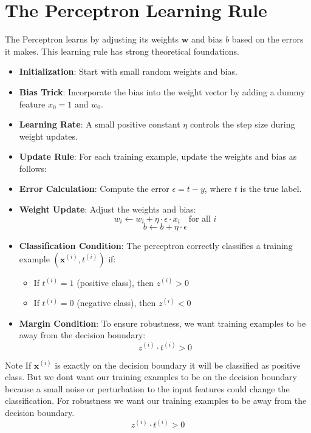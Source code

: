 \section{The Perceptron Learning Rule}
The Perceptron learns by adjusting its weights \(\mathbf{w}\) and bias \(b\) based on the errors it makes. This learning rule has strong theoretical foundations.
\begin{itemize}
    \item \textbf{Initialization}: Start with small random weights and bias.
    \item \textbf{Bias Trick}: Incorporate the bias into the weight vector by adding a dummy feature \(x_0 = 1\) and \(w_0\).
    \item \textbf{Learning Rate}: A small positive constant \(\eta\) controls the step size during weight updates.
    \item \textbf{Update Rule}: For each training example, update the weights and bias as follows:
    \item \textbf{Error Calculation}: Compute the error \(\epsilon = t - y\), where \(t\) is the true label.
    \item \textbf{Weight Update}: Adjust the weights and bias:
    \[ w_i \leftarrow w_i + \eta \cdot \epsilon \cdot x_i \quad \text{for all } i \]
    \[ b \leftarrow b + \eta \cdot \epsilon \]
    \item \textbf{Classification Condition}: The perceptron correctly classifies a training example \((\mathbf{x}^{(i)}, t^{(i)})\) if:
    \begin{itemize}
        \item If \(t^{(i)} = 1\) (positive class), then \(z^{(i)} > 0\)
        \item If \(t^{(i)} = 0\) (negative class), then \(z^{(i)} < 0\)
    \end{itemize}
    \item \textbf{Margin Condition}: To ensure robustness, we want training examples to be away from the decision boundary:
    \[ z^{(i)} \cdot t^{(i)} > 0 \]
      
\end{itemize}

\begin{block}{Note}
    If $\bm{x}^{(i)}$ is exactly on the decision boundary it will be classified as positive class. But we dont want our training examples to be on the decision boundary because a small noise or perturbation to the input features could change the classification. For robustness we want our training examples to be away from the decision boundary.
    \[z^{(i)} \cdot t^{(i)} > 0\]
\end{block}

